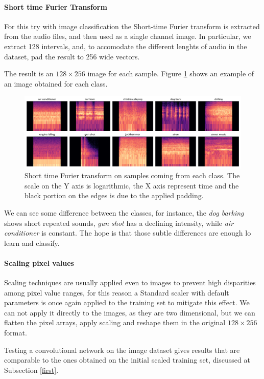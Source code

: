\paragraph{Short time Furier Transform}
For this try with image classification the Short-time Furier transform 
is extracted from the audio files, and then used as a single channel image. 
In particular, we extract 128 intervals, and, to accomodate 
the different lenghts of audio in the dataset, pad the result to 256 wide vectors.

The result is an $128 \times 256$ image for each sample. Figure \ref{img}
shows an example of an image obtained for each class.

\begin{figure}
    \includegraphics[width=\textwidth]{images/class_images.png}  
    \caption{Short time Furier transform on samples coming from each class.
    The scale on the Y axis is logarithmic, the X axis represent time and 
    the black portion on the edges is due to the applied padding.}  
    \label{img}
\end{figure}

We can see some difference between the classes, for instance, the \emph{dog barking}
shows short repeated sounds, \emph{gun shot} has a declining intensity, while \emph{air conditioner}
is constant. The hope is that those subtle differences are enough lo learn and classify.

\paragraph{Scaling pixel values}
Scaling techniques  are usually applied even to images to prevent high disparities 
among pixel value ranges, for this reason a Standard scaler with default parameters is 
once again applied to the training set to mitigate this effect.
We can not apply it directly to the images, as they are two dimensional, but we can 
flatten the pixel arrays, apply scaling and reshape them in the original $128 \times 256$ format.

Testing a convolutional network 
on the image dataset gives results that are comparable to the ones obtained on the initial scaled training 
set, discussed at Subsection \vref{first}.
\newpage